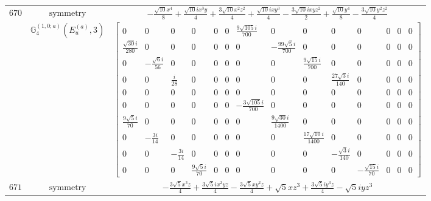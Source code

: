 \documentclass[fleqn,8pt,landscape]{jsarticle}
\begin{document}
\begin{longtable}{ccc}
$ 670 $ & $ \text{symmetry} $ & $ - \frac{\sqrt{10} x^{4}}{8} + \frac{\sqrt{10} i x^{3} y}{4} + \frac{3 \sqrt{10} x^{2} z^{2}}{4} + \frac{\sqrt{10} i x y^{3}}{4} - \frac{3 \sqrt{10} i x y z^{2}}{2} + \frac{\sqrt{10} y^{4}}{8} - \frac{3 \sqrt{10} y^{2} z^{2}}{4} $ \\
$  $ & $ \mathbb{G}_{4}^{(1,0;a)}(E_{u}^{(a)},3) $ & $ \begin{bmatrix} 0 & 0 & 0 & 0 & 0 & 0 & \frac{9 \sqrt{105} i}{700} & 0 & 0 & 0 & 0 & 0 & 0 & 0 \\ \frac{\sqrt{30} i}{280} & 0 & 0 & 0 & 0 & 0 & 0 & - \frac{99 \sqrt{5} i}{700} & 0 & 0 & 0 & 0 & 0 & 0 \\ 0 & - \frac{\sqrt{6} i}{56} & 0 & 0 & 0 & 0 & 0 & 0 & \frac{9 \sqrt{15} i}{700} & 0 & 0 & 0 & 0 & 0 \\ 0 & 0 & \frac{i}{28} & 0 & 0 & 0 & 0 & 0 & 0 & \frac{27 \sqrt{3} i}{140} & 0 & 0 & 0 & 0 \\ 0 & 0 & 0 & 0 & 0 & 0 & 0 & 0 & 0 & 0 & 0 & 0 & 0 & 0 \\ 0 & 0 & 0 & 0 & 0 & 0 & - \frac{3 \sqrt{105} i}{700} & 0 & 0 & 0 & 0 & 0 & 0 & 0 \\ \frac{9 \sqrt{5} i}{70} & 0 & 0 & 0 & 0 & 0 & 0 & \frac{9 \sqrt{30} i}{1400} & 0 & 0 & 0 & 0 & 0 & 0 \\ 0 & - \frac{3 i}{14} & 0 & 0 & 0 & 0 & 0 & 0 & \frac{17 \sqrt{10} i}{1400} & 0 & 0 & 0 & 0 & 0 \\ 0 & 0 & - \frac{3 i}{14} & 0 & 0 & 0 & 0 & 0 & 0 & - \frac{\sqrt{3} i}{140} & 0 & 0 & 0 & 0 \\ 0 & 0 & 0 & \frac{9 \sqrt{5} i}{70} & 0 & 0 & 0 & 0 & 0 & 0 & - \frac{\sqrt{15} i}{70} & 0 & 0 & 0 \end{bmatrix} $ \\ \hline
$ 671 $ & $ \text{symmetry} $ & $ - \frac{3 \sqrt{5} x^{3} z}{4} + \frac{3 \sqrt{5} i x^{2} y z}{4} - \frac{3 \sqrt{5} x y^{2} z}{4} + \sqrt{5} x z^{3} + \frac{3 \sqrt{5} i y^{3} z}{4} - \sqrt{5} i y z^{3} $ \\

\end{longtable}
\end{document}
